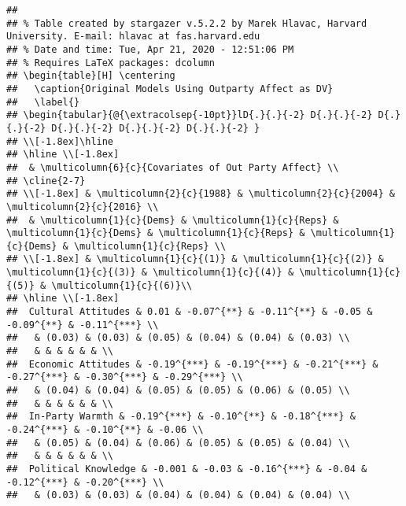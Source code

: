 \documentclass[
]{article}
\begin{document}
\begin{verbatim}
## 
## % Table created by stargazer v.5.2.2 by Marek Hlavac, Harvard University. E-mail: hlavac at fas.harvard.edu
## % Date and time: Tue, Apr 21, 2020 - 12:51:06 PM
## % Requires LaTeX packages: dcolumn 
## \begin{table}[H] \centering 
##   \caption{Original Models Using Outparty Affect as DV} 
##   \label{} 
## \begin{tabular}{@{\extracolsep{-10pt}}lD{.}{.}{-2} D{.}{.}{-2} D{.}{.}{-2} D{.}{.}{-2} D{.}{.}{-2} D{.}{.}{-2} } 
## \\[-1.8ex]\hline 
## \hline \\[-1.8ex] 
##  & \multicolumn{6}{c}{Covariates of Out Party Affect} \\ 
## \cline{2-7} 
## \\[-1.8ex] & \multicolumn{2}{c}{1988} & \multicolumn{2}{c}{2004} & \multicolumn{2}{c}{2016} \\ 
##  & \multicolumn{1}{c}{Dems} & \multicolumn{1}{c}{Reps} & \multicolumn{1}{c}{Dems} & \multicolumn{1}{c}{Reps} & \multicolumn{1}{c}{Dems} & \multicolumn{1}{c}{Reps} \\ 
## \\[-1.8ex] & \multicolumn{1}{c}{(1)} & \multicolumn{1}{c}{(2)} & \multicolumn{1}{c}{(3)} & \multicolumn{1}{c}{(4)} & \multicolumn{1}{c}{(5)} & \multicolumn{1}{c}{(6)}\\ 
## \hline \\[-1.8ex] 
##  Cultural Attitudes & 0.01 & -0.07^{**} & -0.11^{**} & -0.05 & -0.09^{**} & -0.11^{***} \\ 
##   & (0.03) & (0.03) & (0.05) & (0.04) & (0.04) & (0.03) \\ 
##   & & & & & & \\ 
##  Economic Attitudes & -0.19^{***} & -0.19^{***} & -0.21^{***} & -0.27^{***} & -0.30^{***} & -0.29^{***} \\ 
##   & (0.04) & (0.04) & (0.05) & (0.05) & (0.06) & (0.05) \\ 
##   & & & & & & \\ 
##  In-Party Warmth & -0.19^{***} & -0.10^{**} & -0.18^{***} & -0.24^{***} & -0.10^{**} & -0.06 \\ 
##   & (0.05) & (0.04) & (0.06) & (0.05) & (0.05) & (0.04) \\ 
##   & & & & & & \\ 
##  Political Knowledge & -0.001 & -0.03 & -0.16^{***} & -0.04 & -0.12^{***} & -0.20^{***} \\ 
##   & (0.03) & (0.03) & (0.04) & (0.04) & (0.04) & (0.04) \\ 

\end{verbatim}
\end{document}
